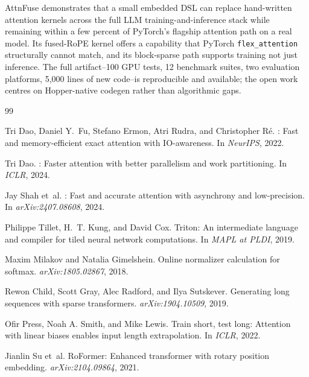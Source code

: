 \documentclass[10pt,twocolumn]{article}
\begin{document}
AttnFuse demonstrates that a small embedded DSL can replace
hand-written attention kernels across the full LLM
training-and-inference stack while remaining within a few percent of
PyTorch's flagship attention path on a real model. Its fused-RoPE
kernel offers a capability that PyTorch \texttt{flex\_attention}
structurally cannot match, and its block-sparse path supports training
not just inference. The full artifact--100 GPU tests, 12 benchmark
suites, two evaluation platforms, 5{,}000 lines of new code--is
reproducible and available; the open work centres on Hopper-native
codegen rather than algorithmic gaps.

\balance


\begin{thebibliography}{99}

Tri Dao, Daniel Y.~Fu, Stefano Ermon, Atri Rudra, and Christopher R\'e.
: Fast and memory-efficient exact attention with IO-awareness.
\newblock In \emph{NeurIPS}, 2022.

Tri Dao.
: Faster attention with better parallelism and work partitioning.
\newblock In \emph{ICLR}, 2024.

Jay Shah et~al.
: Fast and accurate attention with asynchrony and low-precision.
\newblock In \emph{arXiv:2407.08608}, 2024.

Philippe Tillet, H.~T. Kung, and David Cox.
\newblock Triton: An intermediate language and compiler for tiled neural network computations.
\newblock In \emph{MAPL at PLDI}, 2019.

Maxim Milakov and Natalia Gimelshein.
\newblock Online normalizer calculation for softmax.
\newblock \emph{arXiv:1805.02867}, 2018.

Rewon Child, Scott Gray, Alec Radford, and Ilya Sutskever.
\newblock Generating long sequences with sparse transformers.
\newblock \emph{arXiv:1904.10509}, 2019.

Ofir Press, Noah A. Smith, and Mike Lewis.
\newblock Train short, test long: Attention with linear biases enables input length extrapolation.
\newblock In \emph{ICLR}, 2022.

Jianlin Su et~al.
\newblock RoFormer: Enhanced transformer with rotary position embedding.
\newblock \emph{arXiv:2104.09864}, 2021.


\end{thebibliography}
\end{document}
